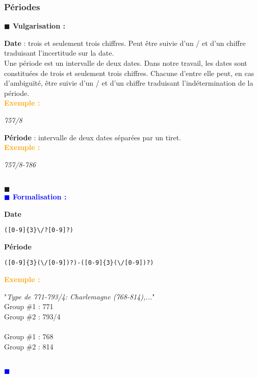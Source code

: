 \documentclass[a4paper, 11pt]{article}
\newenvironment{vulgarisation}
    {
    \textbf{\textcolor{dark-blue}{$\blacksquare$  Vulgarisation : \\}}

    }
    {
    ~\\\textcolor{dark-blue}{$\blacksquare$}\\
    }
\newenvironment{formalisation}
    {
    \textbf{\textcolor{blue}{$\blacksquare$  Formalisation : \\}}
    }
    {
    ~\\\textcolor{blue}{$\blacksquare$}\\
    }
\newenvironment{exemple}
    {
    \textbf{\textcolor{orange}{
    Exemple : \\}}
    }
    {\\
    }
\begin{document}
\subsubsection{Périodes}
\begin{vulgarisation}
	\textbf{Date} : trois et seulement trois chiffres. Peut être suivie d'un \og/\fg{} et d'un chiffre traduisant l'incertitude sur la date.\\
	Une période est un intervalle de deux dates. Dans notre travail, les dates sont constituées de trois et seulement trois chiffres. Chacune d'entre elle peut, en cas d’ambiguïté, être suivie d'un \og/\fg{} et d'un chiffre traduisant l'indétermination de la période.\\
	\begin{exemple}
		\textit{757/8}
	\end{exemple}
	
	\textbf{Période} : intervalle de deux dates séparées par un tiret.\\
	\begin{exemple}
		\textit{757/8-786}
	\end{exemple}
	
\end{vulgarisation}
\begin{formalisation}
	\textbf{Date}
	\begin{verbatim}
([0-9]{3}\/?[0-9]?)
	\end{verbatim}
	\textbf{Période}
	\begin{verbatim}
([0-9]{3}(\/[0-9])?)-([0-9]{3}(\/[0-9])?)
	\end{verbatim}
	\begin{exemple}
		"\emph{Type de 771-793/4: Charlemagne (768-814),...}" \\
		Group \#1 : 771 \\
		Group \#2 : 793/4\\\\\noindent
		Group \#1 : 768 \\
		Group \#2 : 814
	\end{exemple}
\end{formalisation}
\end{document}
